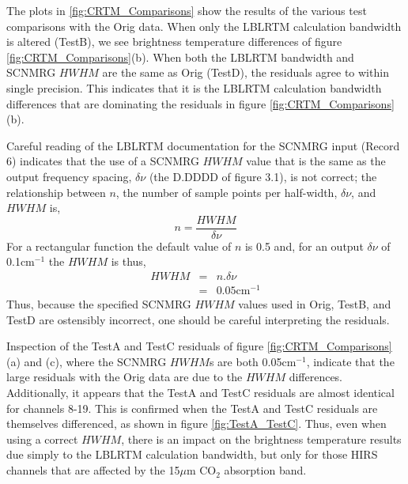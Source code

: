 The plots in \ref{fig:CRTM_Comparisons} show the results of the various test comparisons with the Orig data. When only the LBLRTM calculation
bandwidth is altered (TestB), we see brightness temperature differences of figure \ref{fig:CRTM_Comparisons}(b). When both the LBLRTM bandwidth
and SCNMRG $HWHM$ are the same as Orig (TestD), the residuals agree to within single precision. This indicates that it is the LBLRTM calculation
bandwidth differences that are dominating the residuals in figure \ref{fig:CRTM_Comparisons}(b).

Careful reading of the LBLRTM documentation for the SCNMRG input (Record 6) indicates that the use of a SCNMRG $HWHM$ value that is the same as the output frequency spacing, $\delta\nu$ (the D.DDDD of figure 3.1), is not correct; the relationship between $n$, the number of sample points per half-width, $\delta\nu$, and $HWHM$ is,
\begin{equation}
  n = \frac{HWHM}{\delta\nu}
\end{equation}
For a rectangular function the default value of $n$ is 0.5 and, for an output $\delta\nu$ of 0.1cm$^{-1}$ the $HWHM$ is thus,
\begin{eqnarray}
  HWHM &=& n.\delta\nu\\
       &=& 0.05 \textrm{cm}^{-1}
\end{eqnarray}
Thus, because the specified SCNMRG $HWHM$ values used in Orig, TestB, and TestD are ostensibly incorrect, one should be careful interpreting the residuals. 

Inspection of the TestA and TestC residuals of figure \ref{fig:CRTM_Comparisons}(a) and (c), where the SCNMRG $HWHM$s are 
both 0.05cm$^{-1}$, indicate that the large residuals with the Orig data are due to the $HWHM$ differences. Additionally, it appears that the TestA and TestC residuals are almost identical for channels 8-19. This is confirmed when the TestA and TestC residuals are themselves differenced, as shown in figure \ref{fig:TestA_TestC}. Thus, even when using a correct
$HWHM$, there is an impact on the brightness temperature results due simply to the LBLRTM calculation bandwidth, but only for those HIRS channels that are affected by the 15$\mu$m CO$_2$ absorption band.

